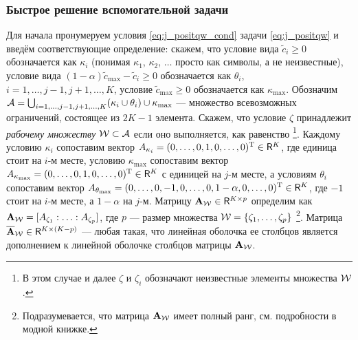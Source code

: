 \documentclass[12pt,a4paper]{article}
\begin{document}
\subsubsection{Быстрое решение вспомогательной задачи}
Для начала пронумеруем условия \eqref{eq:j_positqw_cond} задачи \eqref{eq:j_positqw} и введём соответствующие определение: скажем, что условие вида $\tilde c_i \ge 0$ обозначается как $\kappa_i$ (понимая $\kappa_1$, $\kappa_2$, $\ldots$ просто как символы, а не неизвестные), условие вида $(1 - \alpha) \tilde c_\text{max} - \tilde c_i \ge 0$ обозначается как $\theta_i$, $i = 1, \ldots, j-1, j+1, \ldots, K$, условие $\tilde c_\text{max} \ge 0$ обозначается как $\kappa_\text{max}$. Обозначим $\mathcal{A} = \bigcup_{i = 1, \ldots, j-1, j+1, \ldots, K} (\kappa_i \cup \theta_i) \cup \kappa_\text{max}$ --- множество всевозможных ограничений, состоящее из $2K - 1$ элемента. Скажем, что условие $\zeta$ принадлежит \emph{рабочему множеству} $\mathcal{W} \subset \mathcal{A}$ если оно выполняется, как равенство \footnote{В этом случае и далее $\zeta$ и $\zeta_i$ обозначают неизвестные элементы множества $\mathcal{W}$.}. Каждому условию $\kappa_i$ сопоставим вектор $A_{\kappa_i} = (0, \ldots, 0, 1, 0, \ldots, 0)^{\mathrm{T}} \in \mathsf{R}^K$, где единица стоит на $i$-м месте, условию $\kappa_\text{max}$ сопоставим вектор $A_{\kappa_\text{max}} = (0, \ldots, 0, 1, 0, \ldots, 0)^{\mathrm{T}} \in \mathsf{R}^K$ с единицей на $j$-м месте, а условиям $\theta_i$ сопоставим вектор $A_{\theta_\text{max}} = (0, \ldots, 0, -1, 0, \ldots, 0, 1 - \alpha, 0, \ldots, 0)^{\mathrm{T}} \in \mathsf{R}^K$, где $-1$ стоит на $i$-м месте, а $1-\alpha$ на $j$-м. Матрицу $\mathbf{A}_{\mathcal{W}} \in \mathsf{R}^{K \times p}$ определим как $\mathbf{A}_{\mathcal{W}} = [A_{\zeta_1}:\ldots:A_{\zeta_p}]$, где $p$ --- размер множества $\mathcal{W} = \{\zeta_1, \ldots, \zeta_p\}$ \footnote{Подразумевается, что матрица $\mathbf{A}_{\mathcal{W}}$ имеет полный ранг, см. подробности в модной книжке.}. Матрица $\overline {\mathbf{A}}_{\mathcal{W}} \in \mathsf{R}^{K \times (K-p)}$ --- любая такая, что линейная оболочка ее столбцов является дополнением к линейной оболочке столбцов матрицы $\mathbf{A}_{\mathcal{W}}$.
\end{document}
